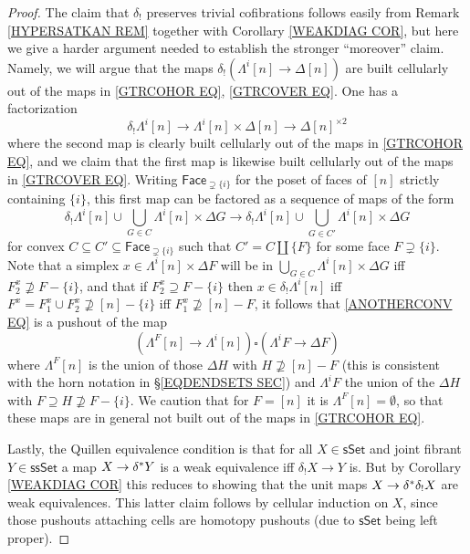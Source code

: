 \documentclass[a4paper,10pt
 ,draft
]{article}%
\begin{document}
\begin{proof}
The claim that $\delta_!$ preserves trivial cofibrations follows easily from Remark \ref{HYPERSATKAN REM} together with Corollary \ref{WEAKDIAG COR}, but here we give a harder argument needed to establish the stronger ``moreover'' claim.
Namely, we will argue that the maps
$\delta_! \left( \Lambda^i[n] \to \Delta[n]\right)$
are built cellularly out of the maps in 
\eqref{GTRCOHOR EQ}, \eqref{GTRCOVER EQ}.
One has a factorization
\[
	\delta_! \Lambda^i[n] \to
	\Lambda^i[n] \times \Delta[n] \to \Delta[n]^{\times 2}
\]
where the second map is clearly built cellularly out of the maps in 
\eqref{GTRCOHOR EQ}, and we claim that 
the first map is likewise built cellularly out of the maps in \eqref{GTRCOVER EQ}.
Writing $\mathsf{Face}_{\supsetneq \{i\}}$ for the poset
of faces of $[n]$ strictly containing $\{i\}$, this first map 
can be factored as a sequence of maps of the form
\begin{equation}\label{ANOTHERCONV EQ}
\delta_! \Lambda^i[n] \cup \bigcup_{G \in C} \Lambda^i[n] \times \Delta G
\to
\delta_! \Lambda^i[n] \cup \bigcup_{G \in C'} \Lambda^i[n] \times \Delta G
\end{equation}
for convex
$C \subseteq C' \subseteq \mathsf{Face}_{\supsetneq \{i\}}$ such that $C' = C \amalg \{F\}$ for some face $F\supsetneq \{i\}$.
Note that a simplex 
$x \in \Lambda^i[n] \times \Delta F$
will be in $\bigcup_{G \in C} \Lambda^i[n] \times \Delta G$ iff 
$F_2^x \not \supseteq F-\{i\}$, 
and that if 
$F_2^x \supseteq F-\{i\}$
then $x \in \delta_! \Lambda^i[n]$ 
iff $F^x=F_1^x \cup F_2^x \not \supseteq [n] - \{i\}$
iff $F_1^x \not \supseteq [n] - F$,
it follows that \eqref{ANOTHERCONV EQ} is a pushout of the map
\begin{equation}\label{LAMBDAFPUSH EQ}
	\left(\Lambda^{F}[n] \to \Lambda^i[n] \right)
		\square
	\left(\Lambda^{i}F \to \Delta F \right)
\end{equation}
where $\Lambda^{F}[n]$ is the union of those $\Delta H$ with $H \not \supseteq [n] - F$ (this is consistent with the horn notation in \S \ref{EQDENDSETS SEC})
and $\Lambda^i F$ the union of the $\Delta H$ with $F \supseteq H \not \supseteq F - \{i\}$.
We caution that for $F=[n]$ it is $\Lambda^F[n]=\emptyset$, so that these maps are in general not built out of the maps in \eqref{GTRCOHOR EQ}. 


Lastly, the Quillen equivalence condition 
is that for all $X \in \mathsf{sSet}$ and joint fibrant
$Y \in \mathsf{ssSet}$ a map
$X \to \delta^{\**} Y$ is a weak equivalence iff 
$\delta_!X \to Y$ is. 
But by Corollary \ref{WEAKDIAG COR}
this reduces to showing
that the unit maps $X \to \delta^{\**} \delta_! X$
are weak equivalences. This latter claim follows by cellular induction on $X$, since those pushouts attaching cells are homotopy pushouts (due to $\mathsf{sSet}$ being left proper).
\end{proof}
\end{document}
